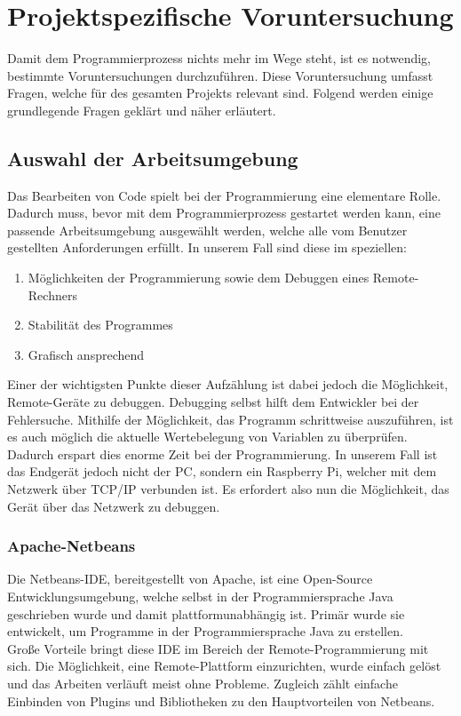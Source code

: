 \section{Projektspezifische Voruntersuchung}\label{sec:projektspezifische-voruntersuchung}
Damit dem Programmierprozess nichts mehr im Wege steht, ist es notwendig, bestimmte Voruntersuchungen durchzuführen.
Diese Voruntersuchung umfasst Fragen, welche für des gesamten Projekts relevant sind.
Folgend werden einige grundlegende Fragen geklärt und näher erläutert.
\subsection{Auswahl der Arbeitsumgebung}\label{subsec:auswahl-der-arbeitsumgebung}
Das Bearbeiten von Code spielt bei der Programmierung eine elementare Rolle.
Dadurch muss, bevor mit dem Programmierprozess gestartet werden kann, eine passende Arbeitsumgebung ausgewählt werden, welche alle vom Benutzer gestellten Anforderungen erfüllt.
In unserem Fall sind diese im speziellen:
\begin{enumerate}
    \item Möglichkeiten der Programmierung sowie dem Debuggen eines Remote-Rechners
    \item Stabilität des Programmes
    \item Grafisch ansprechend
\end{enumerate}
Einer der wichtigsten Punkte dieser Aufzählung ist dabei jedoch die Möglichkeit, Remote-Geräte zu debuggen.
Debugging selbst hilft dem Entwickler bei der Fehlersuche.
Mithilfe der Möglichkeit, das Programm schrittweise auszuführen, ist es auch möglich die aktuelle Wertebelegung von Variablen zu überprüfen.
Dadurch erspart dies enorme Zeit bei der Programmierung.
In unserem Fall ist das Endgerät jedoch nicht der \acs{PC}, sondern ein Raspberry Pi, welcher mit dem Netzwerk über \acs{TCP/IP} verbunden ist.
Es erfordert also nun die Möglichkeit, das Gerät über das Netzwerk zu debuggen.
\subsubsection{Apache-Netbeans}
Die Netbeans-\acs{IDE}, bereitgestellt von Apache, ist eine Open-Source Entwicklungsumgebung, welche selbst in der Programmiersprache Java geschrieben wurde und damit plattformunabhängig ist.
Primär wurde sie entwickelt, um Programme in der Programmiersprache Java zu erstellen.\\
Große Vorteile bringt diese IDE im Bereich der Remote-Programmierung mit sich.
Die Möglichkeit, eine Remote-Plattform einzurichten, wurde einfach gelöst und das Arbeiten verläuft meist ohne Probleme.
Zugleich zählt einfache Einbinden von Plugins und Bibliotheken zu den Hauptvorteilen von Netbeans.
